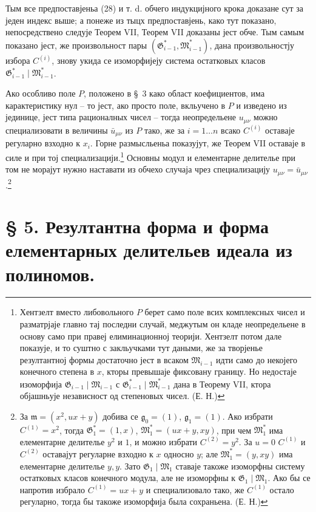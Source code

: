 \documentclass[11pt]{article}
\providecommand{\Gmod}{\mathfrak G}
\providecommand{\Mmod}{\mathfrak M}
\providecommand{\mideal}{\mathfrak m}
\providecommand{\gideal}{\mathfrak g}
\begin{document}
Тым все предпоставјеньа (28) и т. d. обчего индукцијного крока доказане сут за једен индекс выше; а понеже из тыцх предпоставјень, како тут показано, непосредствено следује Теорем VII, Теорем VII доказаны јест обче. Тым самым показано јест, же произвольност пары $(\Gmod^*_{i-1},\Mmod^*_{i-1})$, дана произвольностју избора $C^{(i)}$, знову укида се изоморфијеју система остатковых класов $\Gmod^*_{i-1}\mid\Mmod^*_{i-1}$.

Ако особливо поле $P$, положено в §~3 како област коефициентов, има карактеристику нул -- то јест, ако просто поле, вкльучено в $P$ и изведено из јединице, јест типа рационалных чисел -- тогда неопредельене $u_{\mu\nu}$ можно специализовати в величины $\bar u_{\mu\nu}$ из $P$ тако, же за $i=1\ldots n$ всако $C^{(i)}$ оставаје регуларно взходно к $x_i$. Горне размысльеньа показујут, же Теорем VII оставаје в силе и при тој специализацији.\footnote{Хентзелт вместо либовольного $P$ берет само поле всих комплексных чисел и разматрјаје главно тај последни случай, меджутым он кладе неопредельене в основу само при правеј елиминационној теорији. Хентзелт потом дале показује, и то суштно с закльучками тут даными, же за творјенье резултантној формы достаточно јест в всаком $\Mmod_{i-1}$ идти само до некојего конечного степена в $x$, кторы превышаје фиксовану границу. Но недостаје изоморфија $\Gmod_{i-1}\mid\Mmod_{i-1}$ с $\Gmod^*_{i-1}\mid\Mmod^*_{i-1}$ дана в Теорему VII, ктора објашньује независност од степеновых чисел. (Е. Н.)} Основны модул и елементарне делителье при том не морајут нужно наставати из обчехо случаја чрез специализацију $u_{\mu\nu}=\bar u_{\mu\nu}$.\footnote{За $\mideal=(x^2,ux+y)$ добива се $\gideal_0=(1)$, $\gideal_1=(1)$. Ако избрати $C^{(1)}=x^2$, тогда $\Gmod_1^*=(1,x)$, $\Mmod_1^*=(ux+y,xy)$, при чем $\Mmod_1^*$ има елементарне делителье $y^2$ и $1$, и можно избрати $C^{(2)}=y^2$. За $u=0$ $C^{(1)}$ и $C^{(2)}$ оставајут регуларне взходно к $x$ односно $y$; але $\Mmod_1^*=(y,xy)$ има елементарне делителье $y,y$. Зато $\Gmod_1\mid\Mmod_1$ ставаје такоже изоморфны систему остатковых класов конечного модула, але не изоморфны к $\Gmod_1\mid\Mmod_1$. Ако бы се напротив избрало $C^{(1)}=ux+y$ и специализовало тако, же $C^{(1)}$ остало регуларно, тогда бы такоже изоморфија была сохраньена. (Е. Н.)}

\clearpage
\section*{§ 5. Резултантна форма и форма елементарных делительев идеала из полиномов.}
\end{document}
